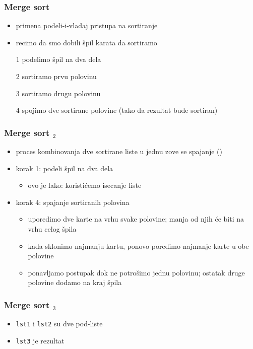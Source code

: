 \documentclass[utf8,compress,aspectratio=169]{beamer}
\begin{document}
\begin{frame}[fragile]
  \frametitle{Merge sort}
  \begin{itemize}
    \item primena podeli-i-vladaj pristupa na sortiranje
    \item recimo da smo dobili špil karata da sortiramo
    \item[1] podelimo špil na dva dela
    \item[2] sortiramo prvu polovinu
    \item[3] sortiramo drugu polovinu
    \item[4] spojimo dve sortirane polovine (tako da rezultat bude sortiran)
  \end{itemize}
\end{frame}

\begin{frame}[fragile]
  \frametitle{Merge sort $_2$}
  \begin{itemize}
    \item proces kombinovanja dve sortirane liste u jednu zove se spajanje ()
    \item korak 1: podeli špil na dva dela
  \begin{itemize}
    \item ovo je lako: koristićemo isecanje liste
  \end{itemize}
    \item korak 4: spajanje sortiranih polovina
  \begin{itemize}
    \item uporedimo dve karte na vrhu svake polovine; manja od njih će biti na vrhu celog špila
    \item kada sklonimo najmanju kartu, ponovo poredimo najmanje karte u obe polovine
    \item ponavljamo postupak dok ne potrošimo jednu polovinu; ostatak druge polovine dodamo na kraj špila
  \end{itemize}
  \end{itemize}
\end{frame}

\begin{frame}[fragile]
  \frametitle{Merge sort $_3$}
  \begin{itemize}
    \item \texttt{lst1} i \texttt{lst2} su dve pod-liste
    \item \texttt{lst3} je rezultat
  \end{itemize}
\end{frame}
\end{document}

